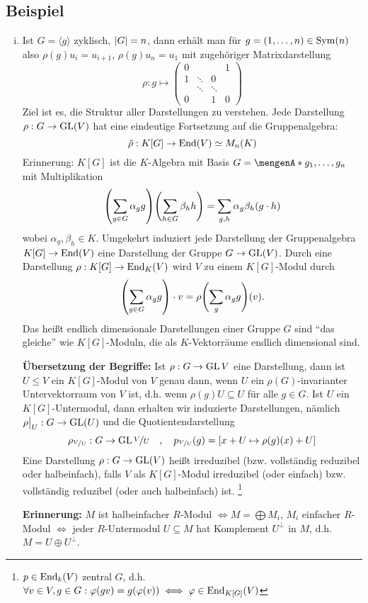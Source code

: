 \subsection{Beispiel} %
\label{sub:42}
\begin{enumerate}[(i)]
	\item Ist $G= \langle g \rangle$ zyklisch, $\abs*{G}=n$, dann erhält man für $g=(1, \ldots ,n) \in \Sym(n)$ also $\rho(g)u_i = u_{i+1}$, $\rho(g)u_n= u_1$ mit
	zugehöriger Matrixdarstellung 
	\[
		\rho : g \longmapsto \begin{pmatrix}
			0 & & & 1 \\
			1 & \ddots & 0 & \\
			 & \ddots & \ddots &\\
			 0 & & 1 & 0
		\end{pmatrix}
	\]
	Ziel ist es, die Struktur aller Darstellungen zu verstehen. Jede Darstellung $\rho : G \to \GL(V)$ hat eine eindeutige Fortsetzung auf die Gruppenalgebra:
	\[
		\tilde{\rho} : K[G] \to \End(V) \simeq M_n(K)
	\]
	Erinnerung: $K[G]$ ist die $K$-Algebra mit Basis $G = \set{g_1, \ldots, g_n}$ mit Multiplikation 
	\[
		\enbrace*{\sum_{g \in G} \alpha_g g} \enbrace*{\sum_{h \in G} \beta_h h} = \sum_{g,h} \alpha_g \beta_h (g \cdot h)
	\]
	wobei $\alpha_g, \beta_h \in K$. Umgekehrt induziert jede Darstellung der Gruppenalgebra $K[G] \to \End(V)$ eine Darstellung der Gruppe $G \to \GL(V)$. Durch eine
	Darstellung $\rho : K[G] \to \End_K(V)$ wird $V$ zu einem $K[G]$-Modul durch 
	\[
		\enbrace*{\sum_{g \in G} \alpha_g g} \cdot v= \rho \enbrace*{\sum_g \alpha_g g}(v).
	\]
	Das heißt endlich dimensionale Darstellungen einer Gruppe $G$ sind \enquote{das gleiche} wie $K[G]$-Moduln, die als $K$-Vektorräume endlich dimensional sind.
	
	
	\textbf{Übersetzung der Begriffe:} Ist $\rho : G \to \GL{V}$ eine Darstellung, dann ist $U \le V$ ein $K[G]$-Modul von $V$ genau dann, wenn $U$ ein $\rho(G)$-invarianter
	Untervektorraum von $V$ ist, d.h. wenn $\rho(g)U \subseteq U$ für alle $g \in G$. Ist $U$ ein $K[G]$-Untermodul, dann erhalten wir induzierte Darstellungen, nämlich 
	$\rho\big|_{U} : G \to \GL(U)$ und die Quotientendarstellung 
	\[
		\rho_{\nicefrac{V}{U}} : G \to \GL{\nicefrac{V}{U}} \quad ,\quad p_{\nicefrac{V}{U}} (g) = \benbrace*{x+ U \mapsto \rho(g)(x)+U}
	\]
	Eine Darstellung $\rho : G \to \GL(V)$ heißt irreduzibel (bzw. vollständig reduzibel oder halbeinfach), falls $V$ als $K[G]$-Modul irreduzibel (oder einfach) bzw.
	vollständig reduzibel (oder auch halbeinfach) ist. \footnote{$p \in \End_k(V)$ zentral $G$, d.h. $\forall v \in V, g \in G : \varphi(g v)= g (\varphi(v)) \iff \varphi 
	\in \End_{K[G]}(V)$}
	
	\textbf{Erinnerung:} $M$ ist halbeinfacher $R$-Modul $\iff M= \bigoplus M_i$, $M_i$ einfacher $R$-Modul $\iff$ jeder $R$-Untermodul $U \subseteq M$ hat Komplement
	$U^\bot$ in $M$, d.h. $M= U \oplus U^\bot$.
\end{enumerate}

